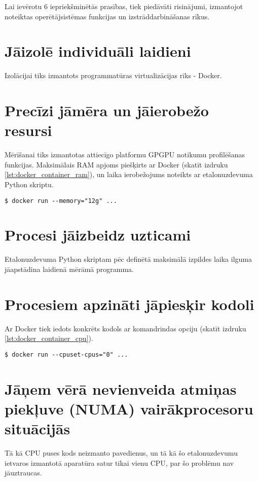 Lai ievērotu 6 iepriekšminētās prasības, tiek piedāvāti risinājumi, izmantojot
noteiktas operētājsistēmas funkcijas un izstrāddarbināšanas rīkus.

\section{Jāizolē individuāli laidieni}
Izolācijai tiks izmantots programmatūras virtualizācijas rīks - Docker.
\cite{docker-docs-engine}

\section{Precīzi jāmēra un jāierobežo resursi}
Mērīšanai tiks izmantotas attiecīgo platformu GPGPU notikumu profilēšanas
funkcijas. Maksimālais RAM apjoms piešķirts ar Docker (skatīt izdruku
\ref{lst:docker_container_ram}), un laika ierobežojums noteikts ar etalonuzdevuma
Python skriptu.
\begin{lstlisting}[caption={Docker konteinera palaišana, piešķirot tam konkrēti
    12GiB RAM},
  captionpos=b,
label=lst:docker_container_ram]
$ docker run --memory="12g" ...
\end{lstlisting}

\section{Procesi jāizbeidz uzticami}
Etalonuzdevuma Python skriptam pēc definētā maksimālā izpildes laika ilguma
jāapstādina laidienā mērāmā programma.

\section{Procesiem apzināti jāpiesķir kodoli}
Ar Docker tiek iedots konkrēts kodols ar komandrindas opciju (skatīt izdruku
\ref{lst:docker_container_cpu}).
\begin{lstlisting}[caption={Docker konteinera palaišana, piešķirot tam konkrēti
    pirmo CPU kodolu}, captionpos=b,
    label=lst:docker_container_cpu]
$ docker run --cpuset-cpus="0" ...
\end{lstlisting}

\section{Jāņem vērā nevienveida atmiņas piekļuve (NUMA) vairākprocesoru situācijās}
Tā kā CPU puses kods neizmanto pavedienus, un tā kā šo etalonuzdevumu ietvaros
izmantotā aparatūra satur tikai vienu CPU, par šo problēmu nav jāuztraucas.


